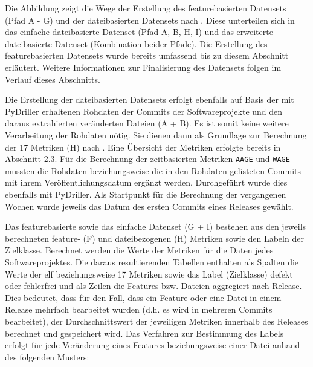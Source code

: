 Die Abbildung zeigt die Wege der Erstellung des featurebasierten Datensets (Pfad A - G) und der dateibasierten Datensets nach \cite{Moser2008}. Diese unterteilen sich in das \glqq einfache\grqq{} dateibasierte Datenset (Pfad A, B, H, I) und das erweiterte dateibasierte Datenset (Kombination beider Pfade). Die Erstellung des featurebasierten Datensets wurde bereits umfassend bis zu diesem Abschnitt erläutert. Weitere Informationen zur Finalisierung des Datensets folgen im Verlauf dieses Abschnitts.

Die Erstellung der dateibasierten Datensets erfolgt ebenfalls auf Basis der mit PyDriller erhaltenen Rohdaten der Commits der Softwareprojekte und den daraus extrahierten veränderten Dateien (A + B). Es ist somit keine weitere Verarbeitung der Rohdaten nötig. Sie dienen dann als Grundlage zur Berechnung der 17 Metriken (H) nach \cite{Moser2008}. Eine Übersicht der Metriken erfolgte bereits in \hyperref[moser-metrics]{Abschnitt 2.3}. Für die Berechnung der zeitbasierten Metriken \texttt{AAGE} und \texttt{WAGE} mussten die Rohdaten beziehungsweise die in den Rohdaten gelisteten Commits mit ihrem Veröffentlichungsdatum ergänzt werden. Durchgeführt wurde dies ebenfalls mit PyDriller. Als Startpunkt für die Berechnung der vergangenen Wochen wurde jeweils das Datum des ersten Commits eines Releases gewählt.

Das featurebasierte sowie das \glqq einfache\grqq{} Datenset (G + I) bestehen aus den jeweils berechneten feature- (F) und dateibezogenen (H) Metriken sowie den Labeln der Zielklasse. Berechnet werden die Werte der Metriken für die Daten jedes Softwareprojektes. Die daraus resultierenden Tabellen enthalten als Spalten die Werte der elf beziehungsweise 17 Metriken sowie das Label (Zielklasse) \glqq defekt\grqq{} oder \glqq fehlerfrei\grqq{} und als Zeilen die Features bzw. Dateien aggregiert nach Release. Dies bedeutet, dass für den Fall, dass ein Feature oder eine Datei in einem Release mehrfach bearbeitet wurden (d.h. es wird in mehreren Commits bearbeitet), der Durchschnittswert der jeweiligen Metriken innerhalb des Releases berechnet und gespeichert wird. Das Verfahren zur Bestimmung des Labels erfolgt für jede Veränderung eines Features beziehungsweise einer Datei anhand des folgenden Musters:

\begin{table}[H]
\centering
{}
\end{table}

